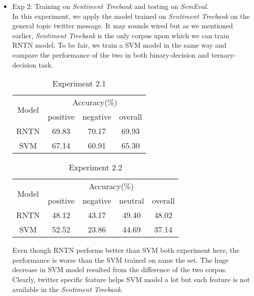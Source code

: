 \begin{itemize}
\item Exp 2: Training on \textit{Sentiment Treebank} and testing on \textit{SemEval}. \\ 
In this experiment, we apply the model trained on \textit{Sentiment Treebank} on the general topic twitter message. It may sounds wired but as we mentioned earlier, \textit{Sentiment Treebank} is the only corpus upon which we can train RNTN model. To be fair, we train a SVM model in the same way and compare the performance of the two in both binary-decision and ternary-decision task. 
\begin{table}[H]
  \begin{center}
    \begin{tabular}{cccc}\hline
      \multirow{2}{*}{Model} 
      & \multicolumn{3}{c}{Accuracy(\%)} \\\cline{2-4}
    & positive & negative & overall \\ \hline
    RNTN  & 69.83     &   70.17	    &   69.93    \\ 
    SVM   & 67.14     &   60.91     &   65.30      \\ \hline
    \end{tabular}
    \end{center}
    \caption{\label{exp5_2_1} Experiment 2.1}
\end{table}

\begin{table}[H]
  \begin{center}
    \begin{tabular}{ccccc}\hline
      \multirow{2}{*}{Model} 
      & \multicolumn{4}{c}{Accuracy(\%)} \\\cline{2-5}
    & positive & negative & neutral & overall \\ \hline
    RNTN  & 48.12    &   43.17  	   &   49.40       & 48.02    \\ 
    SVM   & 52.52    &   23.86     &   44.69       & 37.14    \\ \hline
    \end{tabular}
    \end{center}
    \caption{\label{exp5_2_2} Experiment 2.2}
\end{table}

Even though RNTN performs better than SVM both experiment here, the performance is worse than the SVM trained on same the set. The huge decrease in SVM model resulted from the difference of the two corpus. 
Clearly, twitter specific feature helps SVM model a lot but such feature is not available in the \textit{Sentiment Treebank}. 


\end{itemize}
